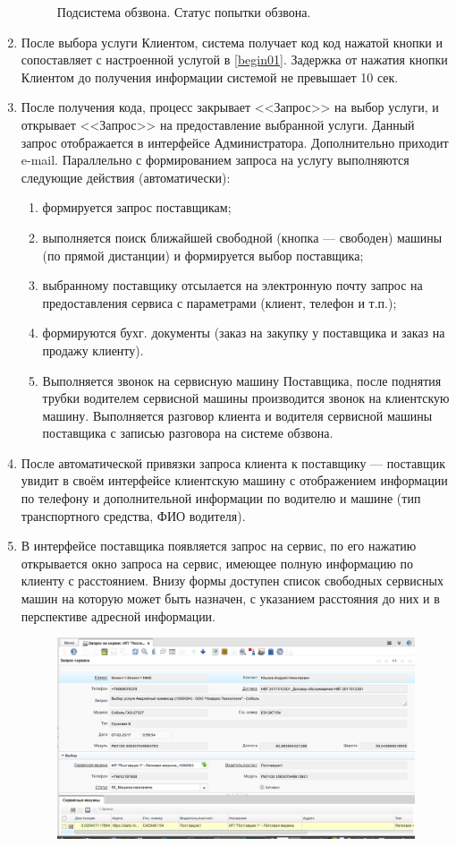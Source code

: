 \documentclass[russian,utf8,12pt,emptystyle]{eskdtext}
\begin{document}
\begin{enumerate}
\begin{figure}[h]
\begin{center}
\end{center}
\caption{Подсистема обзвона. Статус попытки обзвона.}
\label{ris:ncs02}
\end{figure}
\newpage
\item После выбора услуги Клиентом, система получает код код нажатой кнопки и сопоставляет с настроенной услугой в \ref{begin01}. Задержка от нажатия кнопки Клиентом до получения информации системой не превышает 10 сек.
\item После получения кода, процесс закрывает <<Запрос>> на выбор услуги, и открывает <<Запрос>> на предоставление выбранной услуги. Данный запрос отображается в интерфейсе Администратора. Дополнительно приходит e-mail. Параллельно с формированием запроса на услугу выполняются следующие действия (автоматически):
\begin{enumerate}
\item формируется запрос поставщикам;
\item выполняется поиск ближайшей свободной (кнопка --- свободен) машины (по прямой дистанции) и формируется выбор поставщика;
\item выбранному поставщику отсылается на электронную почту запрос на предоставления сервиса с параметрами (клиент, телефон и т.п.);
\item формируются бухг. документы (заказ на закупку у поставщика и заказ на продажу клиенту).
\item Выполняется звонок на сервисную машину Поставщика, после поднятия трубки водителем сервисной машины производится звонок на клиентскую машину. Выполняется разговор клиента и водителя сервисной машины поставщика с записью разговора на системе обзвона.   
\end{enumerate}
\item После автоматической привязки запроса клиента к поставщику --- поставщик увидит в своём интерфейсе клиентскую машину с отображением информации по телефону и дополнительной информации по водителю и машине (тип транспортного средства, ФИО водителя).
\newpage
\item В интерфейсе поставщика появляется запрос на сервис, по его нажатию открывается окно запроса на сервис, имеющее полную информацию по клиенту с расстоянием. Внизу формы доступен список свободных сервисных машин на которую может быть назначен, с указанием расстояния до них и в перспективе адресной информации.
\begin{figure}[h]
\begin{center}
\includegraphics[width=0.9\linewidth]{09}

\end{center}
\end{figure}
\end{enumerate}
\end{document}
